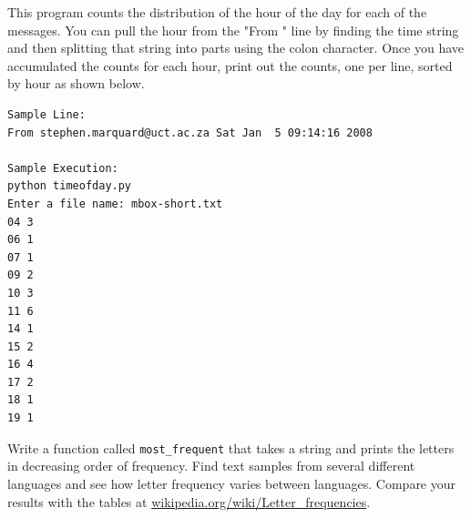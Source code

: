 \documentclass[10pt]{book}
\begin{document}
\begin{ex}
This program counts the distribution of the hour of the day for 
each of the messages. You can pull the hour from the "From " 
line by finding the time string and then splitting that string 
into parts using the colon character. Once you have accumulated 
the counts for each hour, print out the counts, one per line, 
sorted by hour as shown below. 
\beforeverb
\begin{verbatim}
Sample Line:
From stephen.marquard@uct.ac.za Sat Jan  5 09:14:16 2008

Sample Execution:
python timeofday.py
Enter a file name: mbox-short.txt
04 3
06 1
07 1
09 2
10 3
11 6
14 1
15 2
16 4
17 2
18 1
19 1
\end{verbatim}
\afterverb
\end{ex}


\begin{ex}
Write a function called \verb"most_frequent" that takes a string and
prints the letters in decreasing order of frequency.  Find text
samples from several different languages and see how letter frequency
varies between languages.  Compare your results with the tables at
\url{wikipedia.org/wiki/Letter_frequencies}.


\end{ex}
\end{document}
